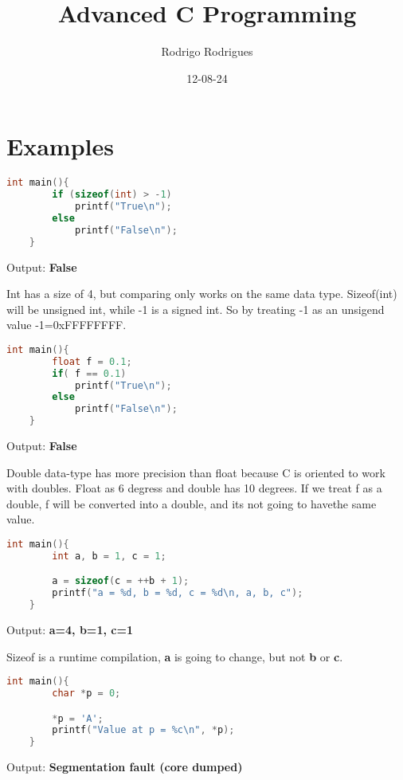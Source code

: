 \documentclass[12pt]{article}
\title{Advanced C Programming}
\author{Rodrigo Rodrigues}
\date{12-08-24}
\begin{document}
\maketitle
\newpage
\section{Examples}
\begin{lstlisting}[language=C, title=size of]
	int main(){
		if (sizeof(int) > -1)
			printf("True\n");
		else
			printf("False\n");
	}
\end{lstlisting}
Output: \textbf{False}

Int has a size of 4, but comparing only works on the same data type.
Sizeof(int) will be unsigned int, while -1 is a signed int. So by treating -1 as an unsigend value -1=0xFFFFFFFF.

\vspace{10mm}

\begin{lstlisting}[language=C, title=float vs double]
	int main(){
		float f = 0.1;
		if( f == 0.1)
			printf("True\n");
		else
			printf("False\n");
	}
\end{lstlisting}
Output: \textbf{False} 

Double data-type has more precision than float because C is oriented to work with doubles. Float as 6 degress and double has 10 degrees. If we treat f as a double, f will be converted into a double, and its not going to havethe same value.

\vspace{10mm}
\newpage

\begin{lstlisting}[language=C, title=Sizeof2]
	int main(){
		int a, b = 1, c = 1;

		a = sizeof(c = ++b + 1);
		printf("a = %d, b = %d, c = %d\n, a, b, c");
	}
\end{lstlisting}
Output: \textbf{a=4, b=1, c=1} 

Sizeof is a runtime compilation, \textbf{a} is going to change, but not \textbf{b} or \textbf{c}.

\vspace{10mm}

\begin{lstlisting}[language=C, title=charptr]
	int main(){
		char *p = 0;

		*p = 'A';
		printf("Value at p = %c\n", *p);
	}
\end{lstlisting}
Output: \textbf{Segmentation fault (core dumped)}
\end{document}
